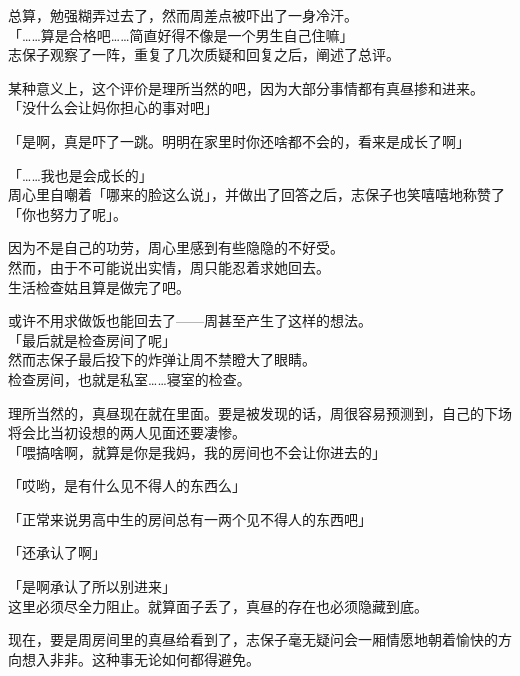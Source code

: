 总算，勉强糊弄过去了，然而周差点被吓出了一身冷汗。\\

「……算是合格吧……简直好得不像是一个男生自己住嘛」\\

志保子观察了一阵，重复了几次质疑和回复之后，阐述了总评。

某种意义上，这个评价是理所当然的吧，因为大部分事情都有真昼掺和进来。\\

「没什么会让妈你担心的事对吧」

「是啊，真是吓了一跳。明明在家里时你还啥都不会的，看来是成长了啊」

「……我也是会成长的」\\

周心里自嘲着「哪来的脸这么说」，并做出了回答之后，志保子也笑嘻嘻地称赞了「你也努力了呢」。

因为不是自己的功劳，周心里感到有些隐隐的不好受。\\

然而，由于不可能说出实情，周只能忍着求她回去。\\

生活检查姑且算是做完了吧。

或许不用求做饭也能回去了——周甚至产生了这样的想法。\\

「最后就是检查房间了呢」\\

然而志保子最后投下的炸弹让周不禁瞪大了眼睛。\\

检查房间，也就是私室……寝室的检查。

理所当然的，真昼现在就在里面。要是被发现的话，周很容易预测到，自己的下场将会比当初设想的两人见面还要凄惨。\\

「喂搞啥啊，就算是你是我妈，我的房间也不会让你进去的」%

「哎哟，是有什么见不得人的东西么」

「正常来说男高中生的房间总有一两个见不得人的东西吧」

「还承认了啊」

「是啊承认了所以别进来」\\

这里必须尽全力阻止。就算面子丢了，真昼的存在也必须隐藏到底。

现在，要是周房间里的真昼给看到了，志保子毫无疑问会一厢情愿地朝着愉快的方向想入非非。这种事无论如何都得避免。\\

